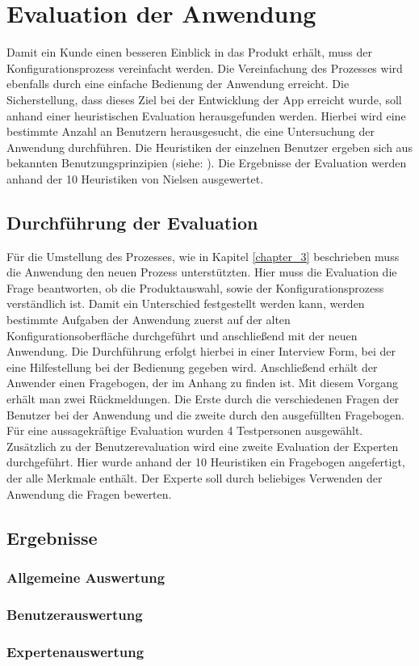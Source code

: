 \chapter{Evaluation der Anwendung}\label{chapter_6}
Damit ein Kunde einen besseren Einblick in das Produkt erhält, muss der Konfigurationsprozess vereinfacht werden. Die Vereinfachung des Prozesses wird ebenfalls durch eine einfache Bedienung der Anwendung erreicht. Die Sicherstellung, dass dieses Ziel bei der Entwicklung der App erreicht wurde, soll anhand einer heuristischen Evaluation herausgefunden werden. Hierbei wird eine bestimmte Anzahl an Benutzern herausgesucht, die eine Untersuchung der Anwendung durchführen. Die Heuristiken der einzelnen Benutzer ergeben sich aus bekannten Benutzungsprinzipien (siehe: \cite{bib:heuristik1}). Die Ergebnisse der Evaluation werden anhand der 10 Heuristiken von Nielsen \cite{bib:heuristik2} ausgewertet.


\section{Durchführung der Evaluation}
Für die Umstellung des Prozesses, wie in Kapitel \ref{chapter_3} beschrieben muss die Anwendung den neuen Prozess unterstützten. Hier muss die Evaluation die Frage beantworten, ob die Produktauswahl, sowie der Konfigurationsprozess verständlich ist. Damit ein Unterschied festgestellt werden kann, werden bestimmte Aufgaben der Anwendung zuerst auf der alten Konfigurationsoberfläche durchgeführt und anschließend mit der neuen Anwendung. Die Durchführung erfolgt hierbei in einer Interview Form, bei der eine Hilfestellung bei der Bedienung gegeben wird. Anschließend erhält der Anwender einen Fragebogen, der im Anhang zu finden ist. Mit diesem Vorgang erhält man zwei Rückmeldungen. Die Erste durch die verschiedenen Fragen der Benutzer bei der Anwendung und die zweite durch den ausgefüllten Fragebogen. Für eine aussagekräftige Evaluation wurden 4 Testpersonen ausgewählt. Zusätzlich zu der Benutzerevaluation wird eine zweite Evaluation der Experten durchgeführt. Hier wurde anhand der 10 Heuristiken ein Fragebogen angefertigt, der alle Merkmale enthält. Der Experte soll durch beliebiges Verwenden der Anwendung die Fragen bewerten. 


\section{Ergebnisse}

\subsection{Allgemeine Auswertung}
\subsection{Benutzerauswertung}
\subsection{Expertenauswertung}
